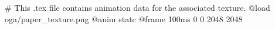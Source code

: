 # This .tex file contains animation data for the associated texture.
@load oga/paper_texture.png
@anim statc
	@frame 100ms 0 0 2048 2048